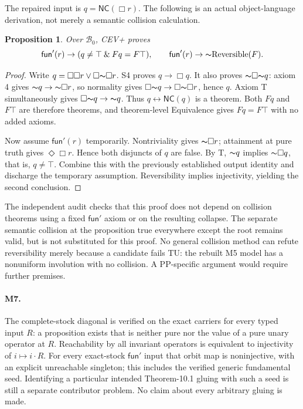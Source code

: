 \documentclass[12pt,leqno]{article}
\newcommand{\AND}{\ensuremath{\mathbin{\&}}}
\newcommand{\OR}{\ensuremath{\vee}}
\newcommand{\IFF}{\ensuremath{\leftrightarrow}}
\newcommand{\IC}{\ensuremath{\rightarrow}}
\newcommand{\NOT}{\ensuremath{\text{$\thicksim$}}}
\newcommand{\funp}{\mathsf{fun}'}
\newcommand{\NC}{\mathsf{NC}}
\newcommand{\Bmin}{\mathcal B_0}
\newtheorem{proposition}{Proposition}
\begin{document}
The repaired input is $q=\NC(\Box r)$. The following is an actual
object-language derivation, not merely a semantic collision calculation.

\begin{proposition}
Over $\Bmin$, CEV+ proves
\[
 \funp(r)\IC(q\neq\top\AND Fq=F\top),
 \qquad
 \funp(r)\IC\NOT\mathrm{Reversible}(F).
\]
\end{proposition}

\begin{proof}
Write $q=\Box\Box r\OR\Box\NOT\Box r$. S4 proves $q\IC\Box q$.
It also proves $\NOT\Box\NOT q$: axiom 4 gives
$\NOT q\IC\NOT\Box r$, so normality gives
$\Box\NOT q\IC\Box\NOT\Box r$, hence $q$. Axiom T simultaneously
gives $\Box\NOT q\IC\NOT q$. Thus $q\IFF\NC(q)$ is a theorem.
Both $Fq$ and $F\top$ are therefore theorems, and theorem-level
Equivalence gives $Fq=F\top$ with no added axioms.

Now assume $\funp(r)$ temporarily. Nontriviality gives $\NOT\Box r$;
attainment at pure truth gives $\Diamond\Box r$. Hence both disjuncts
of $q$ are false. By T, $\NOT q$ implies $\NOT\Box q$, that is,
$q\neq\top$. Combine this with the previously established output
identity and discharge the temporary assumption. Reversibility implies
injectivity, yielding the second conclusion.
\end{proof}

The independent audit checks that this proof does not depend on collision
theorems using a fixed $\funp$ axiom or on the resulting collapse. The separate semantic
collision at the proposition true everywhere except the root remains
valid, but is not substituted for this proof. No general collision method
can refute reversibility merely because a candidate fails TU: the rebuilt
M5 model has a nonuniform involution with no collision. A PP-specific
argument would require further premises.

\paragraph{M7.}
The complete-stock diagonal is verified on the exact carriers for
every typed input $R$: a proposition exists that is neither pure nor the
value of a pure unary operator at $R$. Reachability by all invariant
operators is equivalent to injectivity of $i\mapsto i\cdot R$.
For every exact-stock $\funp$ input that orbit map is noninjective, with
an explicit unreachable singleton; this includes the verified generic
fundamental seed. Identifying a particular intended Theorem-10.1 gluing
with such a seed is still a separate contributor problem. No claim about
every arbitrary gluing is made.
\end{document}

